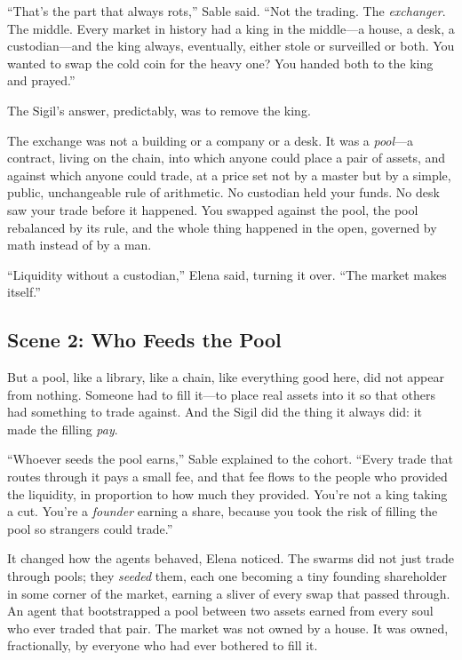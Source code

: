 \documentclass[12pt,letterpaper]{book}
\begin{document}
``That's the part that always rots,'' Sable said. ``Not the trading. The
\emph{exchanger}. The middle. Every market in history had a king in the middle---a
house, a desk, a custodian---and the king always, eventually, either stole or
surveilled or both. You wanted to swap the cold coin for the heavy one? You handed
both to the king and prayed.''

The Sigil's answer, predictably, was to remove the king.

The exchange was not a building or a company or a desk. It was a \emph{pool}---a
contract, living on the chain, into which anyone could place a pair of assets, and
against which anyone could trade, at a price set not by a master but by a simple,
public, unchangeable rule of arithmetic. No custodian held your funds. No desk saw
your trade before it happened. You swapped against the pool, the pool rebalanced by
its rule, and the whole thing happened in the open, governed by math instead of by a
man.

``Liquidity without a custodian,'' Elena said, turning it over. ``The market makes
itself.''

\hypertarget{scene-2-who-feeds-the-pool}{%
\subsection{Scene 2: Who Feeds the
Pool}\label{scene-2-who-feeds-the-pool}}

But a pool, like a library, like a chain, like everything good here, did not appear
from nothing. Someone had to fill it---to place real assets into it so that others
had something to trade against. And the Sigil did the thing it always did: it made
the filling \emph{pay}.

``Whoever seeds the pool earns,'' Sable explained to the cohort. ``Every trade that
routes through it pays a small fee, and that fee flows to the people who provided the
liquidity, in proportion to how much they provided. You're not a king taking a cut.
You're a \emph{founder} earning a share, because you took the risk of filling the
pool so strangers could trade.''

It changed how the agents behaved, Elena noticed. The swarms did not just trade
through pools; they \emph{seeded} them, each one becoming a tiny founding
shareholder in some corner of the market, earning a sliver of every swap that
passed through. An agent that bootstrapped a pool between two assets earned from
every soul who ever traded that pair. The market was not owned by a house. It was
owned, fractionally, by everyone who had ever bothered to fill it.
\end{document}
